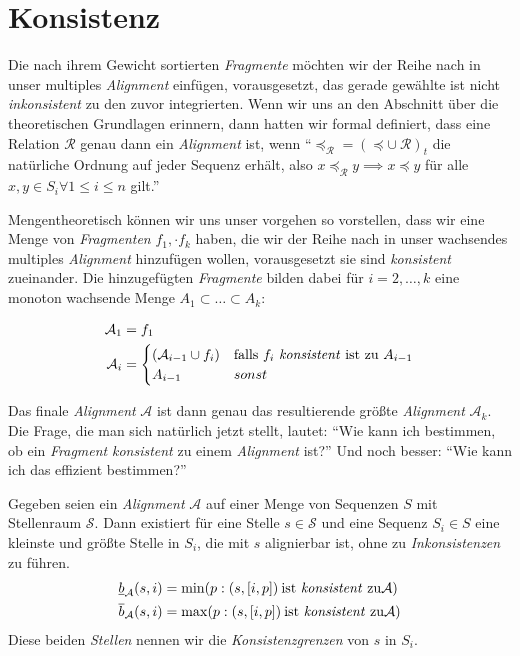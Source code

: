 \section{Konsistenz}

Die nach ihrem Gewicht sortierten \emph{Fragmente} möchten wir der Reihe nach in unser multiples \emph{Alignment} einfügen, vorausgesetzt, das gerade gewählte ist nicht \emph{inkonsistent} zu den zuvor integrierten. Wenn wir uns an den Abschnitt über die theoretischen Grundlagen erinnern, dann hatten wir formal definiert, dass eine Relation $\mathcal{R}$ genau dann ein \emph{Alignment} ist, wenn \enquote{$\preceq_{\mathcal{R}}=(\preceq \cup\: \mathcal{R})_t$ die natürliche Ordnung auf jeder Sequenz erhält, also $x \preceq_{\mathcal{R}} y \implies x \preceq y$ für alle $x,y \in S_i \forall 1\leq i \leq n$ gilt.}

Mengentheoretisch können wir uns unser vorgehen so vorstellen, dass wir eine Menge von \emph{Fragmenten} $f_1, \cdot f_k$ haben, die wir der Reihe nach in unser wachsendes multiples \emph{Alignment} hinzufügen wollen, vorausgesetzt sie sind \emph{konsistent} zueinander. Die hinzugefügten \emph{Fragmente} bilden dabei für $i = 2, \dots, k$ eine monoton wachsende Menge $A_1 \subset \dots \subset A_k$:

\begin{equation}
\begin{split}
	\mathcal{A}_1 &= f_1 \\
	\mathcal{A}_i &= 
		\begin{cases}
			(\mathcal{A}_{i-1} \cup f_i) & \text{falls $f_i$ \emph{konsistent} ist zu $A_{i-1}$} \\
			A_{i-1} & sonst 
		\end{cases}
\end{split}
\end{equation} 

Das finale \emph{Alignment} $\mathcal{A}$ ist dann genau das resultierende größte \emph{Alignment} $\mathcal{A}_k$. Die Frage, die man sich natürlich jetzt stellt, lautet: \enquote{Wie kann ich bestimmen, ob ein \emph{Fragment} \emph{konsistent} zu einem \emph{Alignment} ist?} Und noch besser: \enquote{Wie kann ich das effizient bestimmen?}

\begin{definition}[Konsistenzgrenze]
	Gegeben seien ein \emph{Alignment} $\mathcal{A}$ auf einer Menge von Sequenzen $S$ mit Stellenraum $\mathcal{S}$. Dann existiert für eine Stelle $s \in \mathcal{S}$ und eine Sequenz $S_i \in S$ eine kleinste und größte Stelle in $S_i$, die mit $s$ alignierbar ist, ohne zu \emph{Inkonsistenzen} zu führen.
	\begin{equation}
	\begin{split}
	\underline{b}_\mathcal{A}(s,i) &= \min(p: (s,[i,p])\: \text{ist \emph{konsistent} zu} \mathcal{A}) \\
	\overline{b}_\mathcal{A}(s,i) &= \max(p: (s,[i,p])\: \text{ist \emph{konsistent} zu} \mathcal{A})
	\end{split} 
	\end{equation}
	Diese beiden \emph{Stellen} nennen wir die \emph{Konsistenzgrenzen} von $s$ in $S_i$. 
\end{definition}

